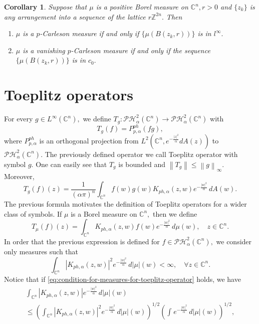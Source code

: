 \documentclass[10pt,leqno]{amsart}
\newtheorem{corollary}[theorem]{Corollary}
\theoremstyle{remark}
\numberwithin{equation}{section}
\newcommand{\hph}{\mathcal{PH}_\alpha^2(\mathbb{C}^n)}%
\newcommand{\Kph}{K_{ph,\alpha}}%
\begin{document}
\begin{corollary}
	Suppose that $\mu$ is a positive Borel measure on $\mathbb{C}^{n},r>0$ and $\{z_k\}$ is any arrangement into a sequence of the lattice $r\mathbb{Z}^{2n}.$ Then
	\begin{enumerate}
		\item $\mu$ is a $p$-Carleson measure if and only if $\{\mu(B(z_k,r))\}$ is in $l^\infty.$
		\item $\mu$ is a vanishing $p$-Carleson measure if and only if the sequence $\{\mu(B(z_k,r))\}$ is in $c_0 .$
	\end{enumerate}
\end{corollary}
\section{Toeplitz operators}
For every $g \in L^{\infty}(\mathbb{C}^{n}),$ we define  $T_g : \hph \to \hph$ with
\[
	T_g(f)=P_{p,\alpha}^{ph}(fg),
\]
where $P_{p,\alpha}^{ph}$ is an orthogonal projection from $L^2(\mathbb{C}^{n},e^{-\frac{|z|^2}{\alpha}}dA(z))$ to $\hph.$ The previously defined operator we call Toeplitz operator with symbol $g.$ One can easily see that $T_g$ is bounded and $\left\lVert T_g \right\rVert \leq \left\lVert g \right\rVert _{\infty}.$ Moreover,
\[
	T_g(f) (z)= \frac{1}{\left( \alpha \pi \right) ^{n}}\int_{\mathbb{C}^{n}}^{}f(w)g(w)\Kph(z,w)e^{-\frac{|w|^2}{\alpha}}\, dA(w).
\]
The previous formula motivates the definition of Toeplitz operators for a wider class of symbols.
If $\mu$ is a Borel measure on $\mathbb{C}^{n},$ then we define
\begin{equation}\label{eq:definition-of-Toeplitz-operator-for-measures}
	T_\mu(f)(z)=\int_{\mathbb{C}^{n}}^{}\Kph(z,w) f(w)e^{- \frac{|w|^2}{\alpha}}	\, d\mu(w), \quad z \in  \mathbb{C}^{n}.
\end{equation}
In order that the previous expression is defined for $f \in \hph,$ we consider only measures such that
\begin{equation}\label{eq:condition-for-measures-for-toeplitz-operator}
	\int_{\mathbb{C}^{n}}^{}\left| \Kph(z,w) \right| ^2 e^{-\frac{|w|^2}{\alpha}}	\, d|\mu|(w)<\infty, \quad \forall z \in  \mathbb{C}^{n}.
\end{equation}
Notice that if \eqref{eq:condition-for-measures-for-toeplitz-operator} holds, we have
\begin{gather*}
	\int_{\mathbb{C}^{n}}^{}\left| \Kph (z,w) \right| e^{-\frac{|w|^2}{\alpha}}\, d|\mu|(w) \\ \leq
	\left( \int_{\mathbb{C}^{n}}^{}\left| \Kph(z,w) \right| ^{2}e^{-\frac{|w|^2}{\alpha}}\, d|\mu|(w) \right) ^{1/2} \left( \int_{}^{}e^{-\frac{|w|^2}{\alpha}}\, d|\mu|(w) \right) ^{1/2},
\end{gather*}
\end{document}
